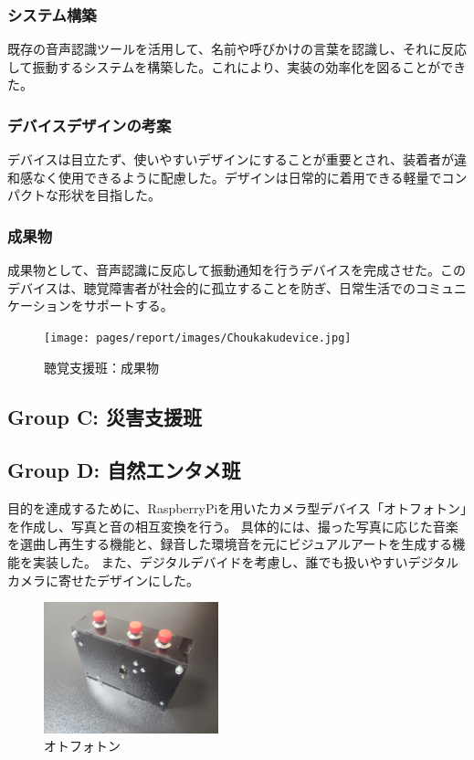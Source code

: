 \subsubsection{システム構築}
既存の音声認識ツールを活用して、名前や呼びかけの言葉を認識し、それに反応して振動するシステムを構築した。これにより、実装の効率化を図ることができた。
\subsubsection{デバイスデザインの考案}
デバイスは目立たず、使いやすいデザインにすることが重要とされ、装着者が違和感なく使用できるように配慮した。デザインは日常的に着用できる軽量でコンパクトな形状を目指した。
\subsubsection{成果物}
成果物として、音声認識に反応して振動通知を行うデバイスを完成させた。このデバイスは、聴覚障害者が社会的に孤立することを防ぎ、日常生活でのコミュニケーションをサポートする。
\begin{figure}[h]
  \centering
  \texttt{[image: pages/report/images/Choukakudevice.jpg]}
  \caption{聴覚支援班：成果物}
  \label{fig:Choukakudevice}
\end{figure}
\subsection{Group C: 災害支援班}

\subsection{Group D: 自然エンタメ班}
目的を達成するために、RaspberryPiを用いたカメラ型デバイス「オトフォトン」を作成し、写真と音の相互変換を行う。
具体的には、撮った写真に応じた音楽を選曲し再生する機能と、録音した環境音を元にビジュアルアートを生成する機能を実装した。
また、デジタルデバイドを考慮し、誰でも扱いやすいデジタルカメラに寄せたデザインにした。

\begin{figure}[h]
  \centering
  \includegraphics[width=0.45\textwidth]{pages/report/images/otophoton.jpg}
  \caption{オトフォトン}
  \label{fig:otophoton}
\end{figure}


